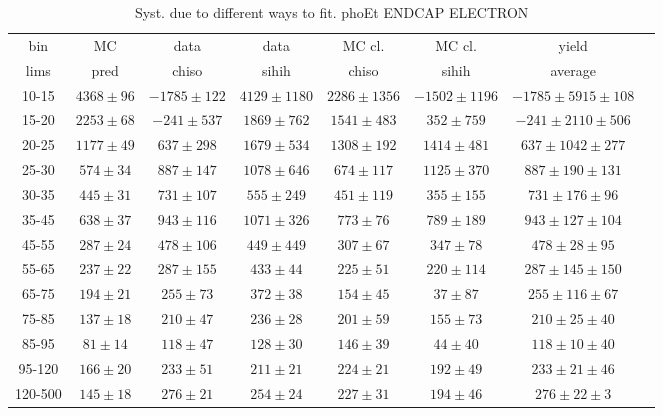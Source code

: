 \begin{table}[h]
  \tiny
  \begin{center}
  \caption{Syst. due to different ways to fit. phoEt ENDCAP ELECTRON}
  \begin{tabular}{|c|c|c|c|c|c|c|c|}
    bin &  MC   & data  & data  & MC cl. & MC cl. & yield\\ 
    lims & pred & chiso & sihih & chiso  & sihih  & average \\ \hline
     10-15 & $4368\pm96$ & $-1785\pm122$ & $4129\pm1180$ & $2286\pm1356$ & $-1502\pm1196$ &$-1785\pm5915\pm108$  \\ \hline
    15-20 & $2253\pm68$ & $-241\pm537$ & $1869\pm762$ & $1541\pm483$ & $352\pm759$ &$-241\pm2110\pm506$  \\ \hline
    20-25 & $1177\pm49$ & $637\pm298$ & $1679\pm534$ & $1308\pm192$ & $1414\pm481$ &$637\pm1042\pm277$  \\ \hline
    25-30 & $574\pm34$ & $887\pm147$ & $1078\pm646$ & $674\pm117$ & $1125\pm370$ &$887\pm190\pm131$  \\ \hline
    30-35 & $445\pm31$ & $731\pm107$ & $555\pm249$ & $451\pm119$ & $355\pm155$ &$731\pm176\pm96$  \\ \hline
    35-45 & $638\pm37$ & $943\pm116$ & $1071\pm326$ & $773\pm76$ & $789\pm189$ &$943\pm127\pm104$  \\ \hline
    45-55 & $287\pm24$ & $478\pm106$ & $449\pm449$ & $307\pm67$ & $347\pm78$ &$478\pm28\pm95$  \\ \hline
    55-65 & $237\pm22$ & $287\pm155$ & $433\pm44$ & $225\pm51$ & $220\pm114$ &$287\pm145\pm150$  \\ \hline
    65-75 & $194\pm21$ & $255\pm73$ & $372\pm38$ & $154\pm45$ & $37\pm87$ &$255\pm116\pm67$  \\ \hline
    75-85 & $137\pm18$ & $210\pm47$ & $236\pm28$ & $201\pm59$ & $155\pm73$ &$210\pm25\pm40$  \\ \hline
    85-95 & $81\pm14$ & $118\pm47$ & $128\pm30$ & $146\pm39$ & $44\pm40$ &$118\pm10\pm40$  \\ \hline
    95-120 & $166\pm20$ & $233\pm51$ & $211\pm21$ & $224\pm21$ & $192\pm49$ &$233\pm21\pm46$  \\ \hline
    120-500 & $145\pm18$ & $276\pm21$ & $254\pm24$ & $227\pm31$ & $194\pm46$ &$276\pm22\pm3$  \\ \hline
  \end{tabular}
  \label{tab:diff_ways_to_fit_phoEt_ENDCAP_electron}
  \end{center}
\end{table}

